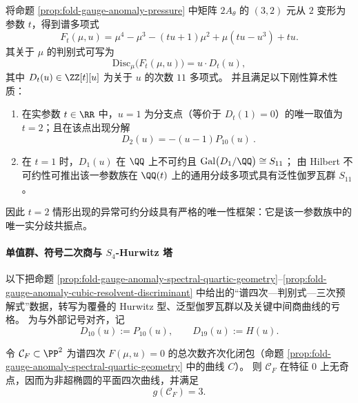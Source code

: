 \begin{proposition}[一参数变形的分歧共振唯一性与泛性伽罗瓦群]\label{prop:fold-gauge-anomaly-branch-resonance-one-parameter}
将命题 \ref{prop:fold-gauge-anomaly-pressure} 中矩阵 \(2A_{\theta}\) 的 \((3,2)\) 元从 \(2\) 变形为参数 \(t\)，得到谱多项式
\[
F_{t}(\mu,u)=\mu^{4}-\mu^{3}-(tu+1)\mu^{2}+\mu(tu-u^{3})+tu.
\]
其关于 \(\mu\) 的判别式可写为
\[
\mathrm{Disc}_{\mu}\bigl(F_{t}(\mu,u)\bigr)=u\cdot D_{t}(u),
\]
其中 \(D_{t}(u)\in\ZZ[t][u]\) 为关于 \(u\) 的次数 \(11\) 多项式。
并且满足以下刚性算术性质：
\begin{enumerate}
\item 在实参数 \(t\in\RR\) 中，\(u=1\) 为分支点（等价于 \(D_{t}(1)=0\)）的唯一取值为 \(t=2\)；且在该点出现分解
\[
\boxed{\ D_{2}(u)=-(u-1)P_{10}(u)\ }.
\]
\item 在 \(t=1\) 时，\(D_{1}(u)\) 在 \(\QQ\) 上不可约且
\(
\mathrm{Gal}\bigl(D_{1}/\QQ\bigr)\cong S_{11}
\)；
由 Hilbert 不可约性可推出该一参数族在 \(\QQ(t)\) 上的通用分歧多项式具有泛性伽罗瓦群 \(S_{11}\)。
\end{enumerate}
因此 \(t=2\) 情形出现的异常可约分歧具有严格的唯一性框架：它是该一参数族中的唯一实分歧共振点。
\end{proposition}

\paragraph{单值群、符号二次商与 \texorpdfstring{$S_4$}{S4}-Hurwitz 塔}\label{par:fold-gauge-anomaly-s4-hurwitz-tower}
以下把命题 \ref{prop:fold-gauge-anomaly-spectral-quartic-geometry}--\ref{prop:fold-gauge-anomaly-cubic-resolvent-discriminant} 中给出的“谱四次—判别式—三次预解式”数据，转写为覆叠的 Hurwitz 型、泛型伽罗瓦群以及关键中间商曲线的亏格。
为与外部记号对齐，记
\[
D_{10}(u):=P_{10}(u),\qquad D_{19}(u):=H(u).
\]

\begin{conclusion}[规范异常四次谱曲线的几何型]\label{con:fold-gauge-anomaly-spectral-quartic-geomtype}
令 \(\mathcal C_F\subset\PP^2\) 为谱四次 \(F(\mu,u)=0\) 的总次数齐次化闭包（命题 \ref{prop:fold-gauge-anomaly-spectral-quartic-geometry} 中的曲线 \(C\)）。
则 \(\mathcal C_F\) 在特征 \(0\) 上无奇点，因而为非超椭圆的平面四次曲线，并满足
\[
g(\mathcal C_F)=3.
\]
\end{conclusion}

